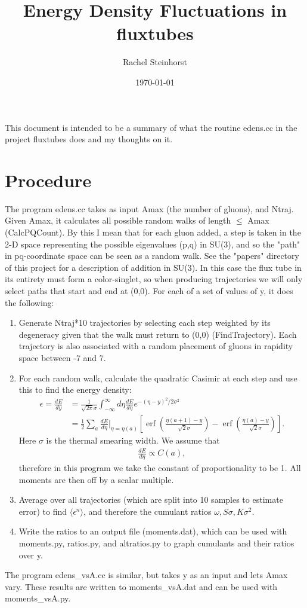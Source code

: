 \documentclass{article}
\DeclareMathOperator\erf{erf}
\begin{document}
\title{Energy Density Fluctuations in fluxtubes}
\author{Rachel Steinhorst}
\date{\today}
\maketitle

This document is intended to be a summary of what the routine edens.cc in the project fluxtubes does and my thoughts on it.

\section*{Procedure}
The program edens.cc takes as input Amax (the number of gluons), and Ntraj. Given Amax, it calculates all possible random walks of length $\leq$ Amax (CalcPQCount). By this I mean that for each gluon added, a step is taken in the 2-D space representing the possible eigenvalues (p,q) in SU(3), and so the "path" in pq-coordinate space can be seen as a random walk. See the "papers" directory of this project for a description of addition in SU(3). In this case the flux tube in its entirety must form a color-singlet, so when producing trajectories we will only select paths that start and end at (0,0). For each of a set of values of y, it does the following:
\begin{enumerate}
  \item Generate Ntraj*10 trajectories by selecting each step weighted by its degeneracy given that the walk must return to (0,0) (FindTrajectory). Each trajectory is also associated with a random placement of gluons in rapidity space between -7 and 7.
  \item For each random walk, calculate the quadratic Casimir at each step and use this to find the energy density:
  \begin{align*}
  \epsilon = \frac{dE}{dy} &= \frac{1}{\sqrt{2 \pi} \sigma} \int_{-\infty}^{\infty} d\eta \frac{dE}{d\eta} e^{-(\eta-y)^2/2\sigma^2}  \\ 
  &= \frac{1}{2} \sum_a \frac{dE}{d\eta}\Bigr\rvert_{\eta=\eta(a)} \left[ \erf\left(\frac{\eta(a+1)-y}{\sqrt{2}\sigma}\right) - \erf\left(\frac{\eta(a)-y}{\sqrt{2}\sigma}\right)\right].
  \end{align*}
 Here $\sigma$ is the thermal smearing width. We assume that
 \begin{align*}
 \frac{dE}{d\eta} \propto C(a),
 \end{align*}
 therefore in this program we take the constant of proportionality to be 1. All moments are then off by a scalar multiple.
  \item Average over all trajectories (which are split into 10 samples to estimate error) to find $\langle\epsilon^n\rangle$, and therefore the cumulant ratios $\omega, S\sigma, K\sigma^2$.
  \item Write the ratios to an output file (moments.dat), which can be used with moments.py, ratios.py, and altratios.py to graph cumulants and their ratios over y.
\end{enumerate}
The program edens\_vsA.cc is similar, but takes y as an input and lets Amax vary. These results are written to moments\_vsA.dat and can be used with moments\_vsA.py.
\end{document}
